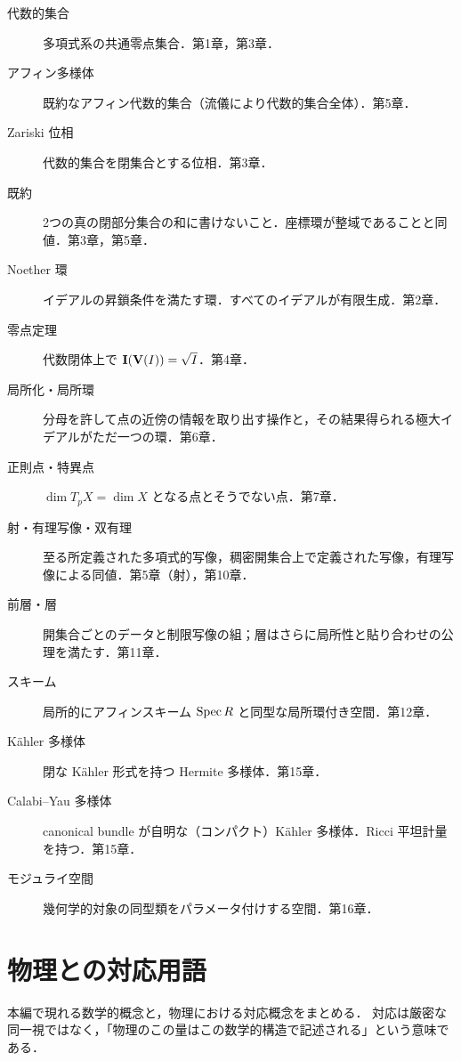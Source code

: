 \begin{description}
\item[代数的集合] 多項式系の共通零点集合．第1章，第3章．
\item[アフィン多様体] 既約なアフィン代数的集合（流儀により代数的集合全体）．第5章．
\item[Zariski 位相] 代数的集合を閉集合とする位相．第3章．
\item[既約] 2つの真の閉部分集合の和に書けないこと．座標環が整域であることと同値．第3章，第5章．
\item[Noether 環] イデアルの昇鎖条件を満たす環．すべてのイデアルが有限生成．第2章．
\item[零点定理] 代数閉体上で $\mathbf{I}(\mathbf{V}(I))=\sqrt I$．第4章．
\item[局所化・局所環] 分母を許して点の近傍の情報を取り出す操作と，その結果得られる極大イデアルがただ一つの環．第6章．
\item[正則点・特異点] $\dim T_pX=\dim X$ となる点とそうでない点．第7章．
\item[射・有理写像・双有理] 至る所定義された多項式的写像，稠密開集合上で定義された写像，有理写像による同値．第5章（射），第10章．
\item[前層・層] 開集合ごとのデータと制限写像の組；層はさらに局所性と貼り合わせの公理を満たす．第11章．
\item[スキーム] 局所的にアフィンスキーム $\operatorname{Spec} R$ と同型な局所環付き空間．第12章．
\item[Kähler 多様体] 閉な Kähler 形式を持つ Hermite 多様体．第15章．
\item[Calabi–Yau 多様体] canonical bundle が自明な（コンパクト）Kähler 多様体．Ricci 平坦計量を持つ．第15章．
\item[モジュライ空間] 幾何学的対象の同型類をパラメータ付けする空間．第16章．
\end{description}

\section{物理との対応用語}

本編で現れる数学的概念と，物理における対応概念をまとめる．
対応は厳密な同一視ではなく，「物理のこの量はこの数学的構造で記述される」という意味である．


